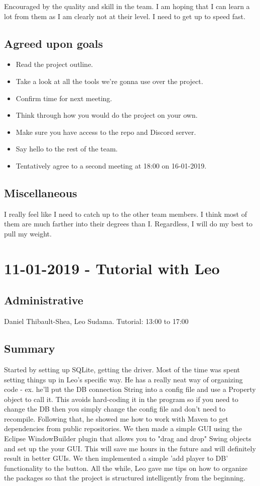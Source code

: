 \documentclass[12pt]{article}
\begin{document}
	Encouraged by the quality and skill in the team. I am hoping that I can learn a lot from them as I am clearly not at their level. I need to get up to speed fast.
	
	\subsection{Agreed upon goals}
	\begin{itemize}
		\item Read the project outline.
		\item Take a look at all the tools we're gonna use over the project.
		\item Confirm time for next meeting.
		\item Think through how you would do the project on your own. 
		\item Make sure you have access to the repo and Discord server. 
		\item Say hello to the rest of the team.
		\item Tentatively agree to a second meeting at 18:00 on 16-01-2019.
	\end{itemize}
	
	\subsection{Miscellaneous}
	I really feel like I need to catch up to the other team members. I think most of them are much farther into their degrees than I. Regardless, I will do my best to pull my weight.
	
	\pagebreak
	
	\section{11-01-2019 - Tutorial with Leo}
	
	\subsection{Administrative}
	Daniel Thibault-Shea, Leo Sudama.
	Tutorial: 13:00 to 17:00
	
	\subsection{Summary}
	Started by setting up SQLite, getting the driver. Most of the time was spent setting things up in Leo's specific way. He has a really neat way of organizing code - ex. he'll put the DB connection String into a config file and use a Property object to call it. This avoids hard-coding it in the program so if you need to change the DB then you simply change the config file and don't need to recompile. Following that, he showed me how to work with Maven to get dependencies from public repositories. We then made a simple GUI using the Eclipse WindowBuilder plugin that allows you to "drag and drop" Swing objects and set up the your GUI. This will save me hours in the future and will definitely result in better GUIs. We then implemented a simple 'add player to DB' functionality to the button. All the while, Leo gave me tips on how to organize the packages so that the project is structured intelligently from the beginning.
	
\end{document}
